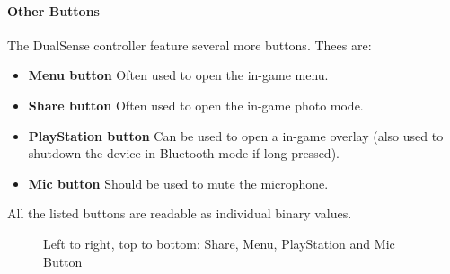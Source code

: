 \paragraph{Other Buttons}
The DualSense controller feature several more buttons. Thees are:
\begin{itemize}
	\item \textbf{Menu button} Often used to open the in-game menu.
	\item \textbf{Share button} Often used to open the in-game photo mode.
	\item \textbf{PlayStation button} Can be used to open a in-game overlay (also used to shutdown the device in Bluetooth mode if long-pressed).
	\item \textbf{Mic button} Should be used to mute the microphone.
\end{itemize}
All the listed buttons are readable as individual binary values.
\begin{figure}[H]
    \centering
    \caption{Left to right, top to bottom: Share, Menu, PlayStation and Mic Button}
\end{figure}

